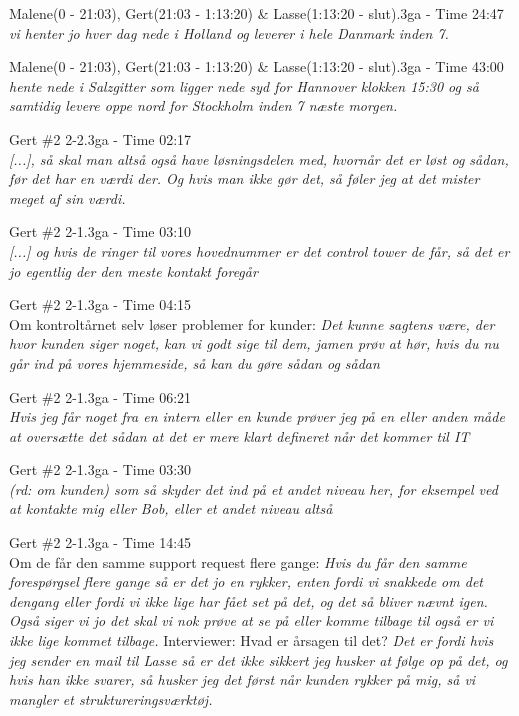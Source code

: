 \begin{thebibliography}{9}

	Malene(0 - 21:03), Gert(21:03 - 1:13:20) \& Lasse(1:13:20 - slut).3ga - Time 24:47\\
	\textit{vi henter jo hver dag nede i Holland og leverer i hele Danmark inden 7.}

	Malene(0 - 21:03), Gert(21:03 - 1:13:20) \& Lasse(1:13:20 - slut).3ga - Time 43:00\\
	\textit{hente nede i Salzgitter som ligger nede syd for Hannover klokken 15:30 og så samtidig levere oppe nord for Stockholm inden 7 næste morgen.}

	Gert \#2 2-2.3ga - Time 02:17\\
	\textit{[...], så skal man altså også have løsningsdelen med, hvornår det er løst og sådan, før det har en værdi der. Og hvis man ikke gør det, så føler jeg at det mister meget af sin værdi.}

	Gert \#2 2-1.3ga - Time 03:10\\
	\textit{[...] og hvis de ringer til vores hovednummer er det control tower de får, så det er jo egentlig der den meste kontakt foregår}

	Gert \#2 2-1.3ga - Time 04:15\\
	Om kontroltårnet selv løser problemer for kunder: \textit{Det kunne sagtens være, der hvor kunden siger noget, kan vi godt sige til dem, jamen prøv at hør, hvis du nu går ind på vores hjemmeside, så kan du gøre sådan og sådan}

	Gert \#2 2-1.3ga - Time 06:21\\
	\textit{Hvis jeg får noget fra en intern eller en kunde prøver jeg på en eller anden måde at oversætte det sådan at det er mere klart defineret når det kommer til IT}

	Gert \#2 2-1.3ga - Time 03:30\\
	\textit{\emph{(rd: om kunden)} som så skyder det ind på et andet niveau her, for eksempel ved at kontakte mig eller Bob, eller et andet niveau altså}

	Gert \#2 2-1.3ga - Time 14:45\\
	Om de får den samme support request flere gange: \textit{Hvis du får den samme forespørgsel flere gange så er det jo en rykker, enten fordi vi snakkede om det dengang eller fordi vi ikke lige har fået set på det, og det så bliver nævnt igen. Også siger vi jo det skal vi nok prøve at se på eller komme tilbage til også er vi ikke lige kommet tilbage.} Interviewer: Hvad er årsagen til det? \textit{Det er fordi hvis jeg sender en mail til Lasse så er det ikke sikkert jeg husker at følge op på det, og hvis han ikke svarer, så husker jeg det først når kunden rykker på mig, så vi mangler et struktureringsværktøj. }


\end{thebibliography}
